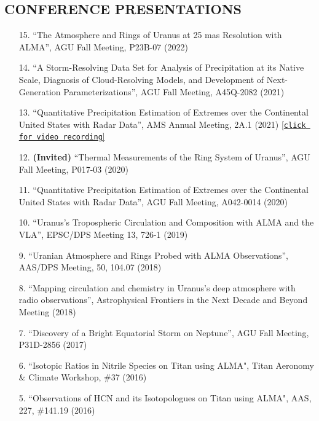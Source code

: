 \documentclass[margin, 10pt]{res} %
\begin{document}
\begin{resume}

\section{CONFERENCE PRESENTATIONS}


\begin{enumerate}
	
\item[15.] ``The Atmosphere and Rings of Uranus at 25 mas Resolution with ALMA'', AGU Fall Meeting, P23B-07 (2022)
\item[14.] ``A Storm-Resolving Data Set for Analysis of Precipitation at its Native Scale, Diagnosis of Cloud-Resolving Models, and Development of Next-Generation Parameterizations'', AGU Fall Meeting, A45Q-2082 (2021)
\item[13.] ``Quantitative Precipitation Estimation of Extremes over the Continental United States with Radar Data'', AMS Annual Meeting, 2A.1 (2021) \href{https://ams.confex.com/ams/101ANNUAL/meetingapp.cgi/Paper/381114}{[\texttt{click for video recording}]}
\item[12.] \textbf{(Invited)} ``Thermal Measurements of the Ring System of Uranus'', AGU Fall Meeting, P017-03 (2020)
\item[11.] ``Quantitative Precipitation Estimation of Extremes over the Continental United States with Radar Data'', AGU Fall Meeting, A042-0014 (2020)
\item[10.] ``Uranus's Tropospheric Circulation and Composition with ALMA and the VLA'', EPSC/DPS Meeting 13, 726-1 (2019)
\item[9.] ``Uranian Atmosphere and Rings Probed with ALMA Observations'', AAS/DPS Meeting, 50, 104.07 (2018)
\item[8.] ``Mapping circulation and chemistry in Uranus's deep atmosphere with radio observations'', Astrophysical Frontiers in the Next Decade and Beyond Meeting (2018)
\item[7.] ``Discovery of a Bright Equatorial Storm on Neptune'', AGU Fall Meeting, P31D-2856 (2017)
\item[6.] ``Isotopic Ratios in Nitrile Species on Titan using ALMA", Titan Aeronomy \& Climate Workshop, \#37 (2016)
\item[5.] ``Observations of HCN and its Isotopologues on Titan using ALMA", AAS, 227, \#141.19 (2016)

\end{enumerate}
\end{resume}
\end{document}
